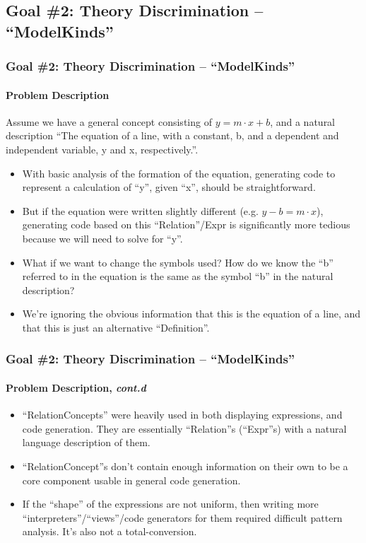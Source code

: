\documentclass{beamer}
\begin{document}
\subsection{Goal \#2: Theory Discrimination -- ``ModelKinds''}

\begin{frame}
    \frametitle{Goal \#2: Theory Discrimination -- ``ModelKinds''}
    \framesubtitle{Problem Description}
    
    Assume we have a general concept consisting of $y = m \cdot x + b$, and a natural description ``The equation of a line, with a constant, b, and a dependent and independent variable, y and x, respectively.''.
    \begin{itemize}
        \item<2-> With basic analysis of the formation of the equation, generating code to represent a calculation of ``y'', given ``x'', should be straightforward.
        \item<3-> But if the equation were written slightly different (e.g. $y - b = m \cdot x$), generating code based on this ``Relation''/Expr is significantly more tedious because we will need to solve for ``y''.
        \item<4-> What if we want to change the symbols used? How do we know the ``b'' referred to in the equation is the same as the symbol ``b'' in the natural description?
        \item<5-> We're ignoring the obvious information that this is the equation of a line, and that this is just an alternative ``Definition''.
    \end{itemize}
\end{frame}

\begin{frame}
    \frametitle{Goal \#2: Theory Discrimination -- ``ModelKinds''}
    \framesubtitle{Problem Description, \emph{cont.d}}
    
    \begin{itemize}
        \item<2-> ``RelationConcepts'' were heavily used in both displaying expressions, and code generation. They are essentially ``Relation''s (``Expr''s) with a natural language description of them.
        \item<3-> ``RelationConcept''s don't contain enough information on their own to be a core component usable in general code generation.
        \item<4-> If the ``shape'' of the expressions are not uniform, then writing more ``interpreters''/``views''/code generators for them required difficult pattern analysis. It's also not a total-conversion.
    \end{itemize}
\end{frame}
\end{document}
